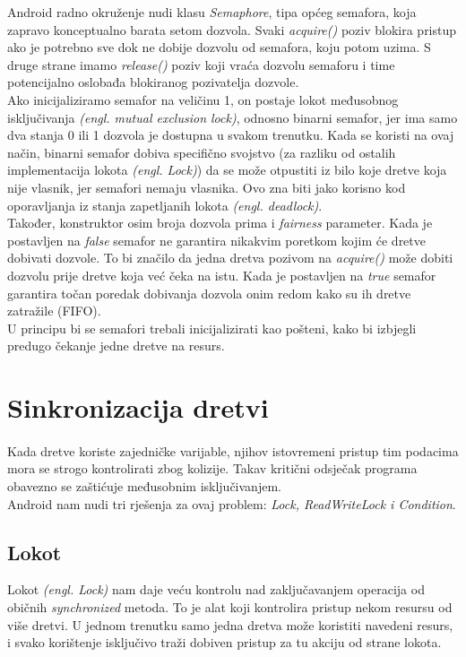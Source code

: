 \documentclass[times, utf8, zavrsni]{fer}
\begin{document}
Android radno okruženje nudi klasu \textit{Semaphore}, tipa općeg semafora, koja zapravo konceptualno barata setom dozvola. Svaki \textit{acquire()} poziv blokira pristup ako je potrebno sve dok ne dobije dozvolu od semafora, koju potom uzima. S druge strane imamo \textit{release()} poziv koji vraća dozvolu semaforu i time potencijalno oslobađa blokiranog pozivatelja dozvole.\\

Ako inicijaliziramo semafor na veličinu 1, on postaje lokot međusobnog isključivanja \textit{(engl. mutual exclusion lock)}, odnosno binarni semafor, jer ima samo dva stanja 0 ili 1 dozvola je dostupna u svakom trenutku. Kada se koristi na ovaj način, binarni semafor dobiva specifično svojstvo (za razliku od ostalih implementacija lokota \textit{(engl. Lock)}) da se može otpustiti iz bilo koje dretve koja nije vlasnik, jer semafori nemaju vlasnika. Ovo zna biti jako korisno kod oporavljanja iz stanja zapetljanih lokota \textit{(engl. deadlock)}.\\

Također, konstruktor osim broja dozvola prima i \textit{fairness} parameter. Kada je postavljen na \textit{false} semafor ne garantira nikakvim poretkom kojim će dretve dobivati dozvole. To bi značilo da jedna dretva pozivom na \textit{acquire()} može dobiti dozvolu prije dretve koja već čeka na istu. Kada je postavljen na \textit{true} semafor garantira točan poredak dobivanja dozvola onim redom kako su ih dretve zatražile (FIFO).\\

U principu bi se semafori trebali inicijalizirati kao pošteni, kako bi izbjegli predugo čekanje jedne dretve na resurs.

\section{Sinkronizacija dretvi}
\paragraph{}
Kada dretve koriste zajedničke varijable, njihov istovremeni pristup tim podacima mora se strogo kontrolirati zbog kolizije. Takav kritični odsječak programa obavezno se zaštićuje međusobnim isključivanjem.\\

Android nam nudi tri rješenja za ovaj problem: \textit{Lock, ReadWriteLock i Condition}.

\subsection{Lokot}
Lokot \textit{(engl. Lock)} nam daje veću kontrolu nad zaključavanjem operacija od običnih \textit{synchronized} metoda. To je alat koji kontrolira pristup nekom resursu od više dretvi. U jednom trenutku samo jedna dretva može koristiti navedeni resurs, i svako korištenje isključivo traži dobiven pristup za tu akciju od strane lokota.
\end{document}
